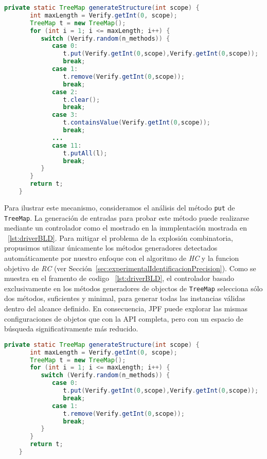 \begin{lstlisting}[language=Java,caption={Controlador con todos los métodos},label={lst:driverAPI},captionpos=b]
    private static TreeMap generateStructure(int scope) {
       int maxLength = Verify.getInt(0, scope);
       TreeMap t = new TreeMap();
       for (int i = 1; i <= maxLength; i++) {
          switch (Verify.random(n_methods)) {
             case 0:
                t.put(Verify.getInt(0,scope),Verify.getInt(0,scope));
                break;
             case 1:
                t.remove(Verify.getInt(0,scope));
                break;						
             case 2:
                t.clear();
                break;
             case 3:
                t.containsValue(Verify.getInt(0,scope));
                break;
             ...
             case 11: 
                t.putAll(l);
                break;
          }
       }
       return t;
    }
\end{lstlisting}

Para ilustrar este mecanismo, consideramos el análisis del método \texttt{put} de \texttt{TreeMap}.
La generación de entradas para probar este método puede realizarse mediante un controlador como el mostrado en la immplentación mostrada en ~\ref{lst:driverBLD}.
Para mitigar el problema de la explosión combinatoria, propusimos utilizar únicamente los métodos generadores 
detectados automáticamente por nuestro enfoque con el algoritmo de \emph{HC} y la funcion objetivo de \emph{RC} (ver Sección~\ref{sec:experimentalIdentificacionPrecision}). 
Como se muestra en el framento de codigo ~\ref{lst:driverBLD}, el controlador basado exclusivamente en los métodos generadores de objectos de 
\texttt{TreeMap} selecciona sólo dos métodos, suficientes y minimal, para generar todas las instancias 
válidas dentro del alcance definido. En consecuencia, JPF puede explorar las mismas configuraciones 
de objetos que con la API completa, pero con un espacio de búsqueda significativamente más reducido.
\\
\begin{lstlisting}[language=Java,caption={Controlador con los métodos generadores de objectos},label={lst:driverBLD},captionpos=b]
    private static TreeMap generateStructure(int scope) {
       int maxLength = Verify.getInt(0, scope);
       TreeMap t = new TreeMap();
       for (int i = 1; i <= maxLength; i++) {
          switch (Verify.random(n_methods)) {
             case 0:
                t.put(Verify.getInt(0,scope),Verify.getInt(0,scope));
                break;
             case 1:
                t.remove(Verify.getInt(0,scope));
                break;						
          }
       }
       return t;
    }
\end{lstlisting}


